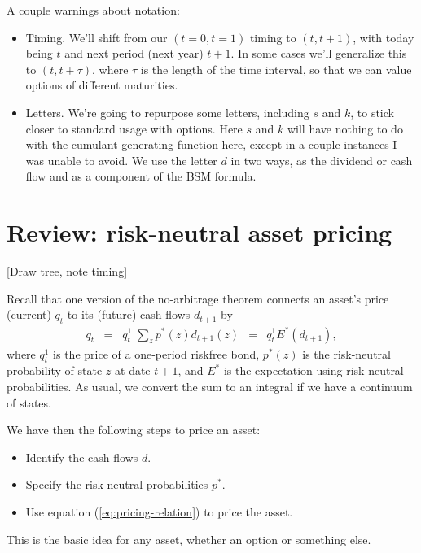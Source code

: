 \documentclass[11pt]{article}
\begin{document}
A couple warnings about notation:
\begin{itemize}
\item Timing.
We'll shift from our $(t=0, t=1)$ timing to $(t, t+1)$,
with today being $t$ and next period (next year) $t+1$.
In some cases we'll generalize this to $(t,t+\tau)$,
where $\tau$ is the length of the time interval,
so that we can value options of different maturities.

\item Letters.
We're going to repurpose some letters, including $s$ and $k$,
to stick closer to standard usage with options.
Here $s$ and $k$ will have nothing to do with the cumulant generating function here,
except in a couple instances I was unable to avoid.
We use the letter $d$ in two ways,
as the dividend or cash flow and as a component of the BSM formula.
\end{itemize}

\section{Review:  risk-neutral asset pricing}
\label{sec:review}

[Draw tree, note timing]

Recall that one version of the no-arbitrage theorem connects an asset's price
(current) $q_t$ to its (future) cash flows $d_{t+1}$ by
\begin{eqnarray}
    q_t \;\;=\;\; q^1_t \; \sum_z p^*(z) d_{t+1}(z)
        &=& q^1_t E^* \left( d_{t+1} \right)  ,
    \label{eq:pricing-relation}
\end{eqnarray}
where $q^1_t$ is the price of a one-period riskfree bond,
$p^*(z)$ is the risk-neutral probability of state $z$ at date $t+1$,
and $E^*$ is the expectation using risk-neutral probabilities.
As usual, we convert the sum to an integral if we have a continuum of states.

We have then the following steps to price an asset:
\begin{itemize}
\item Identify the cash flows $d$.
\item Specify the risk-neutral probabilities $p^*$.
\item Use equation (\ref{eq:pricing-relation}) to price the asset.
\end{itemize}
This is the basic idea for any asset,
whether an option or something else.
\end{document}
